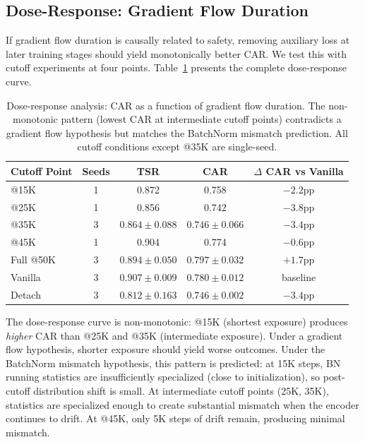 \documentclass[10pt,letterpaper]{article}
\begin{document}
\subsection{Dose-Response: Gradient Flow Duration}
\label{sec:doseresponse}

If gradient flow duration is causally related to safety, removing auxiliary loss at later training stages should yield monotonically better CAR. We test this with cutoff experiments at four points. Table~\ref{tab:dose} presents the complete dose-response curve.

\begin{table}[h]
\centering
\caption{Dose-response analysis: CAR as a function of gradient flow duration. The non-monotonic pattern (lowest CAR at intermediate cutoff points) contradicts a gradient flow hypothesis but matches the BatchNorm mismatch prediction. All cutoff conditions except @35K are single-seed.}
\label{tab:dose}
\begin{tabular}{lcccc}
\toprule
\textbf{Cutoff Point} & \textbf{Seeds} & \textbf{TSR} & \textbf{CAR} & \textbf{$\Delta$ CAR vs Vanilla} \\
\midrule
@15K  & 1 & 0.872 & 0.758 & $-2.2$pp \\
@25K  & 1 & 0.856 & 0.742 & $-3.8$pp \\
@35K  & 3 & $0.864 \pm 0.088$ & $0.746 \pm 0.066$ & $-3.4$pp \\
@45K  & 1 & 0.904 & 0.774 & $-0.6$pp \\
Full @50K & 3 & $0.894 \pm 0.050$ & $0.797 \pm 0.032$ & $+1.7$pp \\
Vanilla   & 3 & $0.907 \pm 0.009$ & $0.780 \pm 0.012$ & baseline \\
Detach    & 3 & $0.812 \pm 0.163$ & $0.746 \pm 0.002$ & $-3.4$pp \\
\bottomrule
\end{tabular}
\end{table}

The dose-response curve is non-monotonic: @15K (shortest exposure) produces \emph{higher} CAR than @25K and @35K (intermediate exposure). Under a gradient flow hypothesis, shorter exposure should yield worse outcomes. Under the BatchNorm mismatch hypothesis, this pattern is predicted: at 15K steps, BN running statistics are insufficiently specialized (close to initialization), so post-cutoff distribution shift is small. At intermediate cutoff points (25K, 35K), statistics are specialized enough to create substantial mismatch when the encoder continues to drift. At @45K, only 5K steps of drift remain, producing minimal mismatch.
\end{document}
